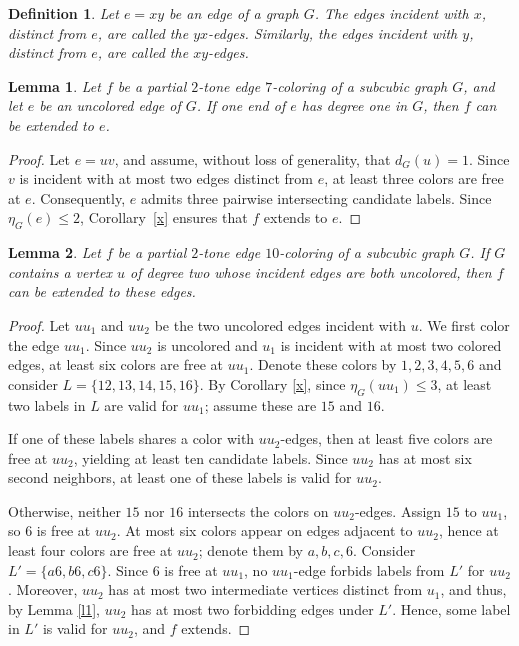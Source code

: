 \documentclass[12pt]{article}
\theoremstyle{plain}
\numberwithin{theorem}{section}
\numberwithin{conjecture}{section}
\numberwithin{corollary}{section}
\numberwithin{example}{section}
\newtheorem{lemma}{Lemma}
\numberwithin{lemma}{section}
\numberwithin{proposition}{section}
\numberwithin{problem}{section}
\numberwithin{remark}{section}
\numberwithin{claim}{theorem}
\newtheorem{definition}{Definition}
\numberwithin{definition}{section}
\begin{document}
\begin{definition}
Let $e=xy$ be an edge of a graph $G$. The edges incident with $x$, distinct from $e$, are called the \emph{$yx$-edges}. Similarly, the edges incident with $y$, distinct from $e$, are called the \emph{$xy$-edges}.
\end{definition}

\begin{lemma}\label{l3}
Let $f$ be a partial $2$-tone edge $7$-coloring of a subcubic graph $G$, and let $e$ be an uncolored edge of $G$. If one end of $e$ has degree one in $G$, then $f$ can be extended to $e$.
\end{lemma}

\begin{proof}
Let $e=uv$, and assume, without loss of generality, that $d_G(u)=1$. Since $v$ is incident with at most two edges distinct from $e$, at least three colors are free at $e$. Consequently, $e$ admits three pairwise intersecting candidate labels. Since $\eta_G(e)\le 2$, Corollary~\ref{x} ensures that $f$ extends to $e$.\end{proof}

\begin{lemma}\label{l4}
Let $f$ be a partial $2$-tone edge $10$-coloring of a subcubic graph $G$. If $G$ contains a vertex $u$ of degree two whose incident edges are both uncolored, then $f$ can be extended to these edges.
\end{lemma}

\begin{proof}
Let $uu_1$ and $uu_2$ be the two uncolored edges incident with $u$. We first color the edge $uu_1$. Since $uu_2$ is uncolored and $u_1$ is incident with at most two colored edges, at least six colors are free at $uu_1$. Denote these colors by $1,2,3,4,5,6$ and consider $L=\{12,13,14,15,16\}$. By Corollary \ref{x}, since $\eta_G(uu_1)\le 3$, at least two labels in $L$ are valid for $uu_1$; assume these are $15$ and $16$.

\noindent If one of these labels shares a color with $uu_2$-edges, then at least five colors are free at $uu_2$, yielding at least ten candidate labels. Since $uu_2$ has at most six second neighbors, at least one of these labels is valid for $uu_2$.

\noindent Otherwise, neither $15$ nor $16$ intersects the colors on $uu_2$-edges. Assign $15$ to $uu_1$, so $6$ is free at $uu_2$. At most six colors appear on edges adjacent to $uu_2$, hence at least four colors are free at $uu_2$; denote them by $a,b,c,6$. Consider $L'=\{a6,b6,c6\}$. Since $6$ is free at $uu_1$, no $uu_1$-edge forbids labels from $L'$ for $uu_2$. Moreover, $uu_2$ has at most two intermediate vertices distinct from $u_1$, and thus, by Lemma \ref{l1}, $uu_2$ has at most two forbidding edges under $L'$. Hence, some label in $L'$ is valid for $uu_2$, and $f$ extends.\end{proof}
\end{document}
